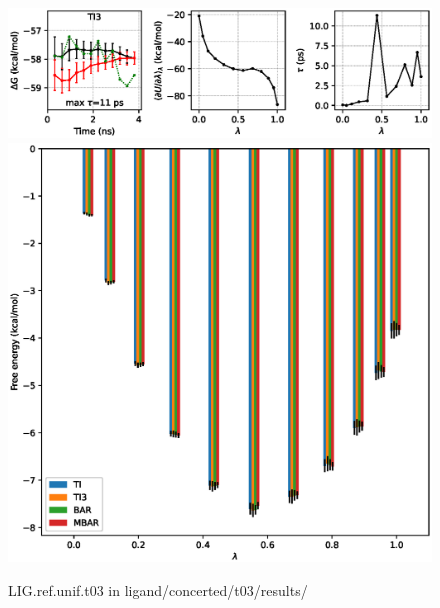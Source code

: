 \documentclass[journal=jctcce,manuscript=article,hyperref=false]{achemso}
\begin{document}
\clearpage
\pagebreak
\begin{figure}
\includegraphics[clip,width=6in]{ligand.concerted.t03.results..GvsT.eps}\vspace{-0.3cm}
\includegraphics[clip,width=6in]{ligand.concerted.t03.results..GvsL.eps}\vspace{-0.3cm}
\caption{LIG.ref.unif.t03 in ligand/concerted/t03/results/}
\end{figure}
\end{document}
